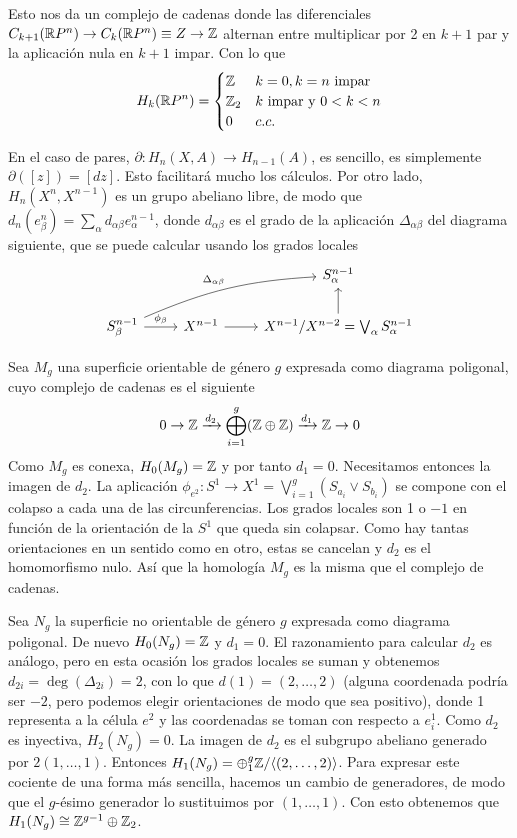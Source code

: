 \documentclass[TA.tex]{subfiles}
\begin{document}
\begin{ej}
Esto nos da un complejo de cadenas donde las diferenciales $C_{k+1}(\mathbb{R} P^n)\to C_k(\mathbb{R} P^n)\equiv Z\to\mathbb{Z}$ alternan entre multiplicar por 2 en $k+1$ par y la aplicación nula en $k+1$ impar. Con lo que
\[
H_k(\mathbb{R} P^n)=\begin{cases}
\mathbb{Z} & k=0, k=n\text{ impar}\\
\mathbb{Z}_2 & k\text{ impar y }0<k<n\\
0 & c.c.
\end{cases}
\]
\end{ej}

En el caso de pares, $\partial: H_n(X,A)\to H_{n-1}(A)$, es sencillo, es simplemente $\partial([z])=[dz]$. Esto facilitará mucho los cálculos. Por otro lado, $H_n(X^n,X^{n-1})$ es un grupo abeliano libre, de modo que $d_n(e^n_{\beta})=\sum_{\alpha}d_{\alpha\beta}e^{n-1}_{\alpha}$, donde $d_{\alpha\beta}$ es el grado de la aplicación $\Delta_{\alpha\beta}$ del diagrama siguiente, que se puede calcular usando los grados locales
\[
\begin{tikzcd}
									     &                  & S^{n-1}_{\alpha}\\
S^{n-1}_{\beta}\arrow[r, "\phi_{\beta}"]\arrow[urr, bend left=10, "\Delta_{\alpha\beta}"] & X^{n-1}\arrow[r] & X^{n-1}/X^{n-2}=\bigvee_\alpha S^{n-1}_{\alpha}\arrow[u]
\end{tikzcd}
\]
\begin{ej}
Sea $M_g$ una superficie orientable de género $g$ expresada como diagrama poligonal, cuyo complejo de cadenas es el siguiente
\[
0\to \mathbb{Z}\xrightarrow{d_2}\bigoplus_{i=1}^g(\mathbb{Z}\oplus\mathbb{Z})\xrightarrow{d_1}\mathbb{Z}\to 0
\]
Como $M_g$ es conexa, $H_0(M_g)=\mathbb{Z}$ y por tanto $d_1=0$. Necesitamos entonces la imagen de $d_2$. La aplicación $\phi_{e^2}:S^1\to X^1=\bigvee_{i=1}^g(S_{a_i}\vee S_{b_i})$ se compone con el colapso a cada una de las circunferencias. Los grados locales son 1 o $-1$ en función de la orientación de la $S ^1$ que queda sin colapsar. Como hay tantas orientaciones en un sentido como en otro, estas se cancelan y $d_2$ es el homomorfismo nulo. Así que la homología $M_g$ es la misma que el complejo de cadenas.
\end{ej}

\begin{ej}
Sea $N_g$ la superficie no orientable de género $g$ expresada como diagrama poligonal. De nuevo $H_0(N_g)=\mathbb{Z}$ y $d_1=0$. El razonamiento para calcular $d_2$ es análogo, pero en esta ocasión los grados locales se suman y obtenemos $d_{2i}=\deg(\Delta_{2i})=2$, con lo que $d(1)=(2,\dots, 2)$ (alguna coordenada podría ser $-2$, pero podemos elegir orientaciones de modo que sea positivo), donde 1 representa a la célula $e^2$ y las coordenadas se toman con respecto a $e_i^1$. Como $d_2$ es inyectiva, $H_2(N_g)=0$. La imagen de $d_2$ es el subgrupo abeliano generado por $2(1,\dots, 1)$. Entonces $H_1(N_g)=\oplus_{1}^g\mathbb{Z}/\langle{(2,\dots, 2)}\rangle$. Para expresar este cociente de una forma más sencilla, hacemos un cambio de generadores, de modo que el $g$-ésimo generador lo sustituimos por $(1,\dots, 1)$. Con esto obtenemos que $H_1(N_g)\cong \mathbb{Z}^{g-1}\oplus\mathbb{Z}_2$.
\end{ej}
\end{document}
